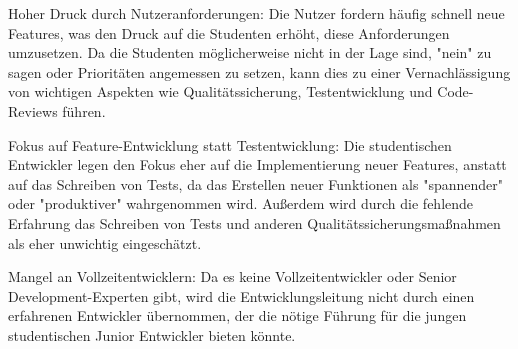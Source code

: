 Hoher Druck durch Nutzeranforderungen: Die Nutzer fordern häufig schnell neue Features, 
was den Druck auf die Studenten erhöht, diese Anforderungen umzusetzen. 
Da die Studenten möglicherweise nicht in der Lage sind, 
"nein" zu sagen oder Prioritäten angemessen zu setzen, 
kann dies zu einer Vernachlässigung von wichtigen Aspekten wie Qualitätssicherung, 
Testentwicklung und Code-Reviews führen. 

Fokus auf Feature-Entwicklung statt Testentwicklung: Die studentischen Entwickler legen den Fokus eher auf 
die Implementierung neuer Features, anstatt auf das Schreiben von Tests, 
da das Erstellen neuer Funktionen als "spannender" oder "produktiver" wahrgenommen wird. 
Außerdem wird durch die fehlende Erfahrung das Schreiben von Tests und anderen 
Qualitätssicherungsmaßnahmen als eher unwichtig eingeschätzt. 

Mangel an Vollzeitentwicklern: Da es keine Vollzeitentwickler oder Senior Development-Experten gibt,
wird die Entwicklungsleitung nicht durch einen erfahrenen Entwickler übernommen, 
der die nötige Führung für die jungen studentischen Junior Entwickler bieten könnte.